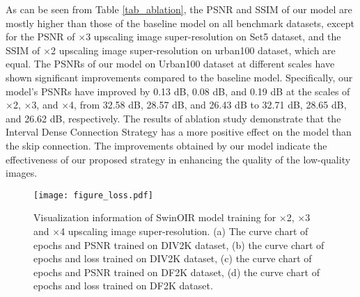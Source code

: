 \documentclass[default,iicol]{sn-jnl}
\theoremstyle{thmstyleone}\newtheorem{theorem}{Theorem}\newtheorem{proposition}[theorem]{Proposition}
\theoremstyle{thmstyletwo}\newtheorem{example}{Example}\newtheorem{remark}{Remark}\theoremstyle{thmstylethree}\newtheorem{definition}{Definition}
\begin{document}
As can be seen from Table \ref{tab_ablation}, the PSNR and SSIM of our model are mostly higher than those of the baseline model on all benchmark datasets, except for the PSNR of $\times$3 upscaling image super-resolution on Set5 dataset, and the SSIM of $\times$2 upscaling image super-resolution on urban100 dataset,  which are equal. The PSNRs of our model on Urban100 dataset at different scales have shown significant improvements compared to the baseline model. Specifically, our model's PSNRs have improved by 0.13 dB, 0.08 dB, and 0.19 dB at the scales of $\times$2, $\times$3, and $\times$4, from 32.58 dB, 28.57 dB, and 26.43 dB to 32.71 dB, 28.65 dB, and 26.62 dB, respectively. The results of ablation study demonstrate that the Interval Dense Connection Strategy has a more positive effect on the model than the skip connection. The improvements obtained by our model indicate the effectiveness of our proposed strategy in enhancing the quality of the low-quality images.

\begin{figure*}[h]
  \centering
  \texttt{[image: figure\_loss.pdf]}
  \caption{Visualization information of SwinOIR model training for $\times$2, $\times$3 and $\times$4 upscaling image super-resolution. (a) The curve chart of epochs and PSNR trained on DIV2K dataset, (b) the curve chart of epochs and loss trained on DIV2K dataset, (c) the curve chart of epochs and PSNR trained on DF2K dataset, (d) the curve chart of epochs and loss trained on DF2K dataset.}
  \label{fig_loss}
\end{figure*}
\end{document}
